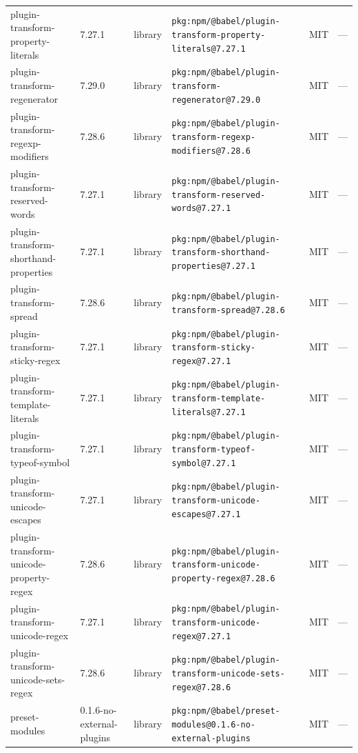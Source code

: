 \documentclass[11pt,a4paper]{article}
\begin{document}
\begin{longtable}{|p{4cm}|p{2cm}|p{1.6cm}|p{5cm}|p{1.5cm}|p{3.5cm}|}
\raggedright plugin-transform-property-literals & 7.27.1 & library & \small\texttt{pkg:npm/@babel/plugin-transform-property-literals@7.27.1} & MIT & \small — \\
\raggedright plugin-transform-regenerator & 7.29.0 & library & \small\texttt{pkg:npm/@babel/plugin-transform-regenerator@7.29.0} & MIT & \small — \\
\raggedright plugin-transform-regexp-modifiers & 7.28.6 & library & \small\texttt{pkg:npm/@babel/plugin-transform-regexp-modifiers@7.28.6} & MIT & \small — \\
\raggedright plugin-transform-reserved-words & 7.27.1 & library & \small\texttt{pkg:npm/@babel/plugin-transform-reserved-words@7.27.1} & MIT & \small — \\
\raggedright plugin-transform-shorthand-properties & 7.27.1 & library & \small\texttt{pkg:npm/@babel/plugin-transform-shorthand-properties@7.27.1} & MIT & \small — \\
\raggedright plugin-transform-spread & 7.28.6 & library & \small\texttt{pkg:npm/@babel/plugin-transform-spread@7.28.6} & MIT & \small — \\
\raggedright plugin-transform-sticky-regex & 7.27.1 & library & \small\texttt{pkg:npm/@babel/plugin-transform-sticky-regex@7.27.1} & MIT & \small — \\
\raggedright plugin-transform-template-literals & 7.27.1 & library & \small\texttt{pkg:npm/@babel/plugin-transform-template-literals@7.27.1} & MIT & \small — \\
\raggedright plugin-transform-typeof-symbol & 7.27.1 & library & \small\texttt{pkg:npm/@babel/plugin-transform-typeof-symbol@7.27.1} & MIT & \small — \\
\raggedright plugin-transform-unicode-escapes & 7.27.1 & library & \small\texttt{pkg:npm/@babel/plugin-transform-unicode-escapes@7.27.1} & MIT & \small — \\
\raggedright plugin-transform-unicode-property-regex & 7.28.6 & library & \small\texttt{pkg:npm/@babel/plugin-transform-unicode-property-regex@7.28.6} & MIT & \small — \\
\raggedright plugin-transform-unicode-regex & 7.27.1 & library & \small\texttt{pkg:npm/@babel/plugin-transform-unicode-regex@7.27.1} & MIT & \small — \\
\raggedright plugin-transform-unicode-sets-regex & 7.28.6 & library & \small\texttt{pkg:npm/@babel/plugin-transform-unicode-sets-regex@7.28.6} & MIT & \small — \\
\raggedright preset-modules & 0.1.6-no-external-plugins & library & \small\texttt{pkg:npm/@babel/preset-modules@0.1.6-no-external-plugins} & MIT & \small — \\

\end{longtable}
\end{document}
